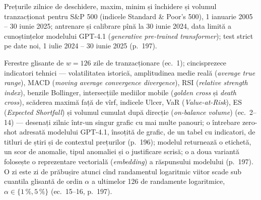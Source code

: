 \textbf{} %
{Prețurile zilnice de deschidere, maxim, minim și închidere și volumul tranzacționat pentru S\&P 500 (indicele Standard \& Poor's 500), 1 ianuarie 2005 -- 30 iunie 2025; antrenare și calibrare pînă la 30 iunie 2024, data limită a cunoștințelor modelului GPT-4.1 (\emph{generative pre-trained transformer}); test strict pe date noi, 1 iulie 2024 -- 30 iunie 2025 (p.~197).}

\textbf{} %
{Ferestre glisante de $w=126$ zile de tranzacționare (ec.~1); cincisprezece indicatori tehnici --- volatilitatea istorică, amplitudinea medie reală (\emph{average true range}), MACD (\emph{moving average convergence divergence}), RSI (\emph{relative strength index}), benzile Bollinger, intersecțiile mediilor mobile (\emph{golden cross} și \emph{death cross}), scăderea maximă față de vîrf, indicele Ulcer, VaR (\emph{Value-at-Risk}), ES (\emph{Expected Shortfall}) și volumul cumulat după direcție (\emph{on-balance volume}) (ec.~2--14) --- desenați zilnic într-un singur grafic cu mai multe panouri; o întrebare zero-shot adresată modelului GPT-4.1, însoțită de grafic, de un tabel cu indicatori, de titluri de știri și de contextul prețurilor (p.~196); modelul returnează o etichetă, un scor de anomalie, tipul anomaliei și o justificare scrisă; o a doua variantă folosește o reprezentare vectorială (\emph{embedding}) a răspunsului modelului (p.~197).
O zi este zi de prăbușire atunci cînd randamentul logaritmic viitor scade sub cuantila glisantă de ordin $\alpha$ a ultimelor 126 de randamente logaritmice, $\alpha\in\{1\,\%, 5\,\%\}$ (ec.~15--16, p.~197).}

